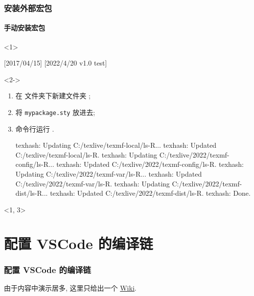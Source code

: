 \begin{frame}[fragile, t]
  \frametitle{安装外部宏包}
  \framesubtitle{手动安装宏包}
\begin{onlyenv}<1>
\begin{latexcode}
[2017/04/15]
[2022/4/20 v1.0 test]
\newcommand{\mycmd}{Hello \LaTeX}  
\end{latexcode}
\end{onlyenv}
\begin{onlyenv}<2->
  \begin{enumerate}
    \item 在  文件夹下新建文件夹 ;
    \item 将 \texttt{mypackage.sty} 放进去;
    \item 命令行运行 .
  \begin{outputcode}
  texhash: Updating C:/texlive/texmf-local/ls-R...
  texhash: Updated C:/texlive/texmf-local/ls-R.
  texhash: Updating C:/texlive/2022/texmf-config/ls-R...
  texhash: Updated C:/texlive/2022/texmf-config/ls-R.
  texhash: Updating C:/texlive/2022/texmf-var/ls-R...
  texhash: Updated C:/texlive/2022/texmf-var/ls-R.
  texhash: Updating C:/texlive/2022/texmf-dist/ls-R...
  texhash: Updated C:/texlive/2022/texmf-dist/ls-R.
  texhash: Done.
  \end{outputcode}
  \end{enumerate}
\end{onlyenv}
\begin{onlyenv}<1, 3>
\end{onlyenv}
\end{frame}

\section{配置 VSCode 的编译链}

\begin{frame}
  \frametitle{配置 VSCode 的编译链}
  由于内容中演示居多, 这里只给出一个 \href{https://gitee.com/xkwxdyy/CCNUthesis/wikis/\%E5\%B8\%B8\%E8\%A7\%81\%E9\%97\%AE\%E9\%A2\%98FAQ/\%E5\%A6\%82\%E4\%BD\%95\%E5\%AE\%89\%E8\%A3\%85\%E3\%80\%81\%E9\%85\%8D\%E7\%BD\%AE\%E5\%92\%8C\%E4\%BD\%BF\%E7\%94\%A8VScode\#config-LW}{Wiki}. 
\end{frame}
